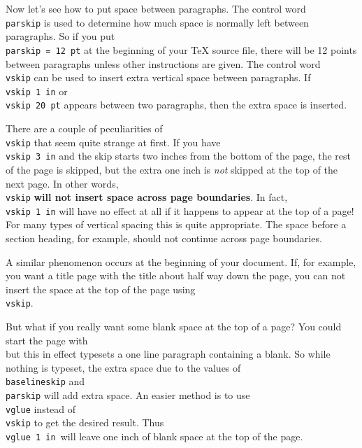 Now let's see how to put space between paragraphs.  The control 
word {\tt \\parskip} is used to determine how much space is 
normally left between paragraphs. So if you put {\tt \\parskip = 
12 pt} at the beginning of your \TeX{} source file, there will be 
12 points between paragraphs unless other instructions are 
given. The control word {\tt \\vskip} can be used to insert extra 
vertical space between paragraphs.  If {\tt \\vskip 1 in} or {\tt 
\\vskip 20 pt} appears between two paragraphs, then the extra 
space is inserted. 
 
There are a couple of peculiarities of {\tt \\vskip} that seem 
quite strange at first.  If you have {\tt \\vskip 3 in} and the 
skip starts two inches from the bottom of the page, the rest of 
the page is skipped, but the extra one inch is {\it not\/} 
skipped at the top of the next page.  In other words, {\tt \\vskip} 
{\bf will not insert space across page boundaries}.  In 
fact, {\tt \\vskip~1~in} will have no effect at all if it happens 
to appear at the top of a page! For many types of vertical 
spacing this is quite appropriate.  The space before a section 
heading, for example, should not continue across page boundaries. 
 
A similar phenomenon occurs at the beginning of your document. 
If, for example, you want a title page with the title about half 
way down the page, you can not insert the space at the top of the 
page using {\tt \\vskip}. 
 
But what if you really want some blank space at the top of a 
page? You could start the page with {\tt\\\sp} but this in effect 
typesets a one line paragraph containing a blank. So while 
nothing is typeset, the extra space due to the values of {\tt 
\\baselineskip} and {\tt \\parskip} will add extra space. An easier 
method is to use {\tt \\vglue} instead of {\tt \\vskip} to get 
the desired result.  Thus {\tt \\vglue 1 in\ }will leave one inch 
of blank space at the top of the page. 
 
